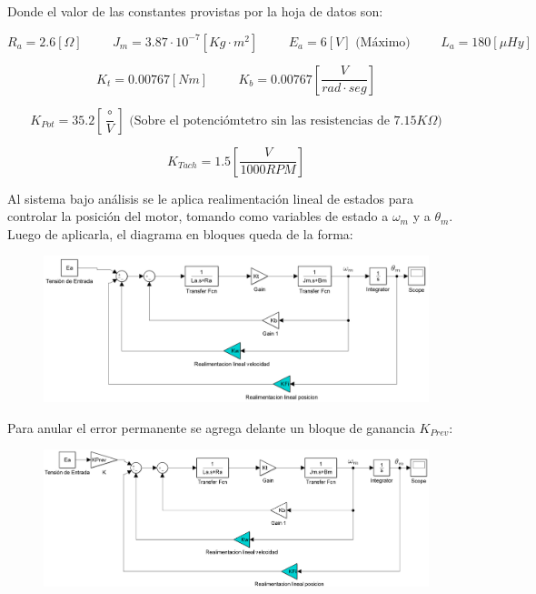 \documentclass{article}
\begin{document}
Donde el valor de las constantes provistas por la hoja de datos son:

\[
R_a = 2.6 [\Omega] \hspace{1cm} J_m = 3.87 \cdot 10^{-7} [Kg \cdot m^2] \hspace{1cm} E_a = 6 [V] \textrm{ (Máximo)} \hspace{1cm} L_a = 180 [\mu Hy] \hspace{1cm}
\]

\[
K_t = 0.00767[Nm] \hspace{1cm} K_b = 0.00767 \left[\frac{V}{rad \cdot seg}\right] 
\]

\[
K_{Pot} = 35.2 \left[ \frac{\circ}{V} \right] \textrm{ (Sobre el potenciómtetro sin las resistencias de }7.15K\Omega)
\]

\[
K_{Tach} = 1.5 \left[  \frac{V}{1000RPM} \right]
\]

\newpage

Al sistema bajo análisis se le aplica realimentación lineal de estados para controlar la posición del motor, tomando como variables de estado a $\omega_m$ y a $\theta_m$. Luego de aplicarla, el diagrama en bloques queda de la forma:

\begin{figure}[H]
\centering
\includegraphics[width=1\linewidth]{../Images/DiagramaFeed.png}
\end{figure}

Para anular el error permanente se agrega delante un bloque de ganancia $K_{Prev}$:

\begin{figure}[H]
\centering
\includegraphics[width=1\linewidth]{../Images/DiagramaFeedConKP.png}
\end{figure}
\end{document}
